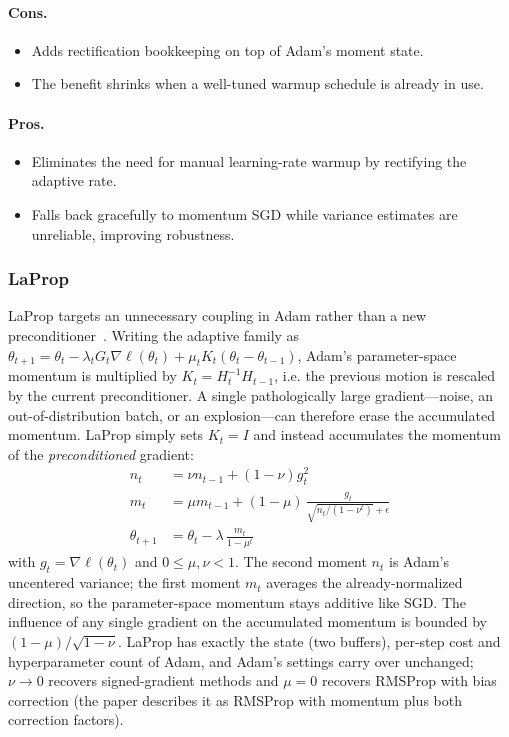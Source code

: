 \paragraph{Cons.}
\begin{itemize}[leftmargin=*]
\item Adds rectification bookkeeping on top of Adam's moment state.
\item The benefit shrinks when a well-tuned warmup schedule is already in use.
\end{itemize}

\paragraph{Pros.}
\begin{itemize}[leftmargin=*]
\item Eliminates the need for manual learning-rate warmup by rectifying the adaptive rate.
\item Falls back gracefully to momentum SGD while variance estimates are unreliable, improving robustness.
\end{itemize}


\subsubsection{LaProp}
LaProp targets an unnecessary coupling in Adam rather than a new
preconditioner~\citep{ziyin_laprop_2021}. Writing the adaptive family as
$\theta_{t+1} = \theta_t - \lambda_t G_t \nabla\ell(\theta_t) + \mu_t K_t(\theta_t - \theta_{t-1})$,
Adam's parameter-space momentum is multiplied by $K_t = H_t^{-1}H_{t-1}$, i.e.
the previous motion is rescaled by the current preconditioner. A single
pathologically large gradient---noise, an out-of-distribution batch, or an
explosion---can therefore erase the accumulated momentum. LaProp simply sets
$K_t = I$ and instead accumulates the momentum of the \emph{preconditioned}
gradient:
\begin{align}
n_t &= \nu n_{t-1} + (1-\nu) g_t^2 \\
m_t &= \mu m_{t-1} + (1-\mu)\,\frac{g_t}{\sqrt{n_t/(1-\nu^t)} + \epsilon} \\
\theta_{t+1} &= \theta_t - \lambda\,\frac{m_t}{1-\mu^t}
\end{align}
with $g_t = \nabla\ell(\theta_t)$ and $0 \le \mu, \nu < 1$. The second moment
$n_t$ is Adam's uncentered variance; the first moment $m_t$ averages the
already-normalized direction, so the parameter-space momentum stays additive
like SGD. The influence of any single gradient on the accumulated momentum is
bounded by $(1-\mu)/\sqrt{1-\nu}$. LaProp has exactly the state (two buffers),
per-step cost and hyperparameter count of Adam, and Adam's settings carry over
unchanged; $\nu \to 0$ recovers signed-gradient methods and $\mu = 0$ recovers
RMSProp with bias correction (the paper describes it as RMSProp with momentum
plus both correction factors).


